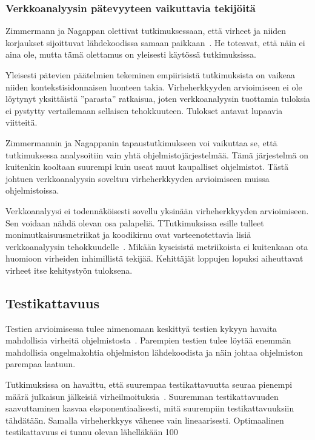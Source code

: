 \documentclass[finnish]{../tktltiki2}
\theoremstyle{definition}
\theoremstyle{remark}
\begin{document}
\subsubsection{Verkkoanalyysin pätevyyteen vaikuttavia tekijöitä}

Zimmermann ja Nagappan olettivat tutkimuksessaan, että virheet ja niiden korjaukset sijoittuvat lähdekoodissa samaan 
paikkaan~\cite{ZN08}. He toteavat, että näin ei aina ole, mutta tämä olettamus on yleisesti käytössä tutkimuksissa.

    Yleisesti pätevien päätelmien tekeminen empiirisistä tutkimuksista on vaikeaa niiden kontekstisidonnaisen luonteen 
takia. Virheherkkyyden arvioimiseen ei ole löytynyt yksittäistä ''parasta'' ratkaisua, joten verkkoanalyysin tuottamia 
tuloksia ei pystytty vertailemaan sellaisen tehokkuuteen. Tulokset antavat lupaavia viitteitä.

   Zimmermannin ja Nagappanin tapaustutkimukseen voi vaikuttaa se, että tutkimuksessa analysoitiin vain yhtä 
ohjelmistojärjestelmää. Tämä järjestelmä on kuitenkin kooltaan suurempi kuin useat muut kaupalliset ohjelmistot. Tästä 
johtuen verkkoanalyysin soveltuu virheherkkyyden arvioimiseen muissa ohjelmistoissa. 

    Verkkoanalyysi ei todennäköisesti sovellu yksinään virheherkkyyden arvioimiseen. Sen voidaan nähdä olevan osa 
palapeliä. TTutkimuksissa esille tulleet monimutkaisuusmetriikat ja koodikirnu ovat varteenotettavia lisiä 
verkkoanalyysin tehokkuudelle~\cite{ZN08}. Mikään kyseisistä metriikoista ei kuitenkaan ota huomioon virheiden 
inhimillistä tekijää. Kehittäjät loppujen lopuksi aiheuttavat virheet itse kehitystyön tuloksena.

\subsection{Testikattavuus}

Testien arvioimisessa tulee nimenomaan keskittyä testien kykyyn havaita mahdollisia virheitä 
ohjelmistosta~\cite{MNDT09}. Parempien testien tulee löytää enemmän mahdollisia ongelmakohtia ohjelmiston lähdekoodista 
ja näin johtaa ohjelmiston parempaa laatuun.

    Tutkimuksissa on havaittu, että suurempaa testikattavuutta seuraa pienempi määrä julkaisun jälkeisiä 
virheilmoituksia~\cite{MNDT09}. Suuremman testikattavuuden saavuttaminen kasvaa eksponentiaalisesti, mitä suurempiin 
testikattavuuksiin tähdätään. Samalla virheherkkyys vähenee vain lineaarisesti. Optimaalinen testikattavuus ei tunnu 
olevan lähelläkään 100 %
\end{document}
